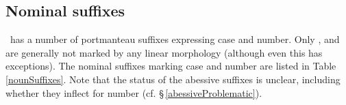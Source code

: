 \subsection{Nominal suffixes}\label{nominalSuffixes}
\PS\ has a number of portmanteau suffixes expressing case and number. 
Only ,  and  are generally %
not marked by any linear morphology (although even this has exceptions). The nominal suffixes marking case and number are listed in Table \vref{nounSuffixes}. Note that the status of the abessive suffixes is unclear, including whether they inflect for number (cf. §\,\ref{abessiveProblematic}).

